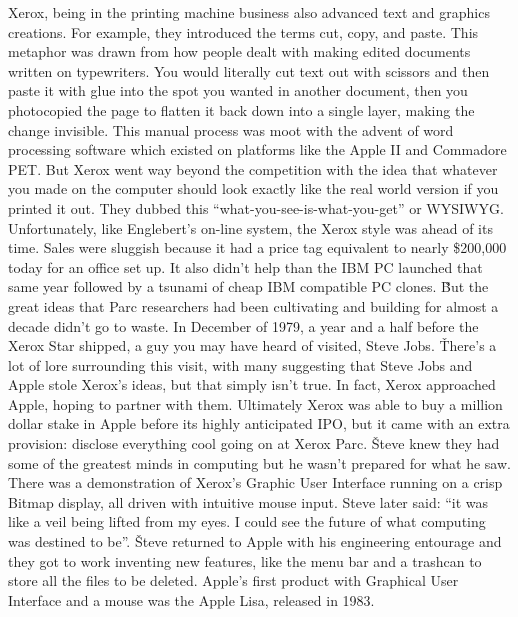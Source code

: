 Xerox, being in the printing machine business also advanced text and graphics creations. For example, they introduced
the terms cut, copy, and paste. This metaphor was drawn from how people dealt with making edited documents written on
typewriters. You would literally cut text out with scissors and then paste it with glue into the spot you wanted in
another document, then you photocopied the page to flatten it back down into a single layer, making the change
invisible. This manual process was moot with the advent of word processing software which existed on platforms like
the Apple II and Commadore PET. But Xerox went way beyond the competition with the idea that whatever you made on the
computer should look exactly like the real world version if you printed it out. They dubbed this
``what-you-see-is-what-you-get'' or WYSIWYG. Unfortunately, like Englebert's on-line system, the Xerox style was
ahead of its time. Sales were sluggish because it had a price tag equivalent to nearly \$200,000 today for an office
set up. It also didn't help than the IBM PC launched that same year followed by a tsunami of cheap IBM compatible PC
clones. \v

But the great ideas that Parc researchers had been cultivating and building for almost a decade didn't go to waste.
In December of 1979, a year and a half before the Xerox Star shipped, a guy you may have heard of visited, Steve Jobs.
\v

There's a lot of lore surrounding this visit, with many suggesting that Steve Jobs and Apple stole Xerox's ideas, but
that simply isn't true. In fact, Xerox approached Apple, hoping to partner with them. Ultimately Xerox was able to
buy a million dollar stake in Apple before its highly anticipated IPO, but it came with an extra provision: disclose
everything cool going on at Xerox Parc. \v

Steve knew they had some of the greatest minds in computing but he wasn't prepared for what he saw. There was a
demonstration of Xerox's Graphic User Interface running on a crisp Bitmap display, all driven with intuitive mouse
input. Steve later said: ``it was like a veil being lifted from my eyes. I could see the future of what computing was
destined to be''. \v

Steve returned to Apple with his engineering entourage and they got to work inventing new features, like the menu bar
and a trashcan to store all the files to be deleted. Apple's first product with Graphical User Interface and a mouse
was the Apple Lisa, released in 1983.


